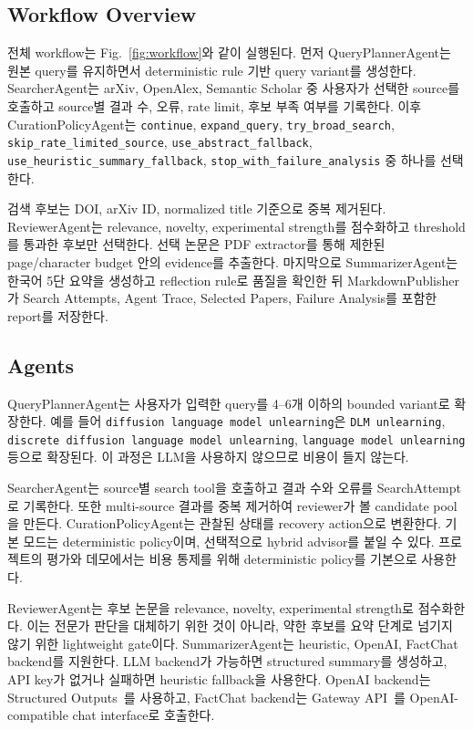 \documentclass[sigconf,nonacm]{acmart}
\begin{document}
\subsection{Workflow Overview}

전체 workflow는 Fig.~\ref{fig:workflow}와 같이 실행된다. 먼저 QueryPlannerAgent는 원본 query를 유지하면서 deterministic rule 기반 query variant를 생성한다. SearcherAgent는 arXiv, OpenAlex, Semantic Scholar 중 사용자가 선택한 source를 호출하고 source별 결과 수, 오류, rate limit, 후보 부족 여부를 기록한다. 이후 CurationPolicyAgent는 \texttt{continue}, \texttt{expand\_query}, \texttt{try\_broad\_search}, \texttt{skip\_rate\_limited\_source}, \texttt{use\_abstract\_fallback}, \texttt{use\_heuristic\_summary\_fallback}, \texttt{stop\_with\_failure\_analysis} 중 하나를 선택한다.

검색 후보는 DOI, arXiv ID, normalized title 기준으로 중복 제거된다. ReviewerAgent는 relevance, novelty, experimental strength를 점수화하고 threshold를 통과한 후보만 선택한다. 선택 논문은 PDF extractor를 통해 제한된 page/character budget 안의 evidence를 추출한다. 마지막으로 SummarizerAgent는 한국어 5단 요약을 생성하고 reflection rule로 품질을 확인한 뒤 MarkdownPublisher가 Search Attempts, Agent Trace, Selected Papers, Failure Analysis를 포함한 report를 저장한다.

\subsection{Agents}

QueryPlannerAgent는 사용자가 입력한 query를 4--6개 이하의 bounded variant로 확장한다. 예를 들어 \texttt{diffusion language model unlearning}은 \texttt{DLM unlearning}, \texttt{discrete diffusion language model unlearning}, \texttt{language model unlearning} 등으로 확장된다. 이 과정은 LLM을 사용하지 않으므로 비용이 들지 않는다.

SearcherAgent는 source별 search tool을 호출하고 결과 수와 오류를 SearchAttempt로 기록한다. 또한 multi-source 결과를 중복 제거하여 reviewer가 볼 candidate pool을 만든다. CurationPolicyAgent는 관찰된 상태를 recovery action으로 변환한다. 기본 모드는 deterministic policy이며, 선택적으로 hybrid advisor를 붙일 수 있다. 프로젝트의 평가와 데모에서는 비용 통제를 위해 deterministic policy를 기본으로 사용한다.

ReviewerAgent는 후보 논문을 relevance, novelty, experimental strength로 점수화한다. 이는 전문가 판단을 대체하기 위한 것이 아니라, 약한 후보를 요약 단계로 넘기지 않기 위한 lightweight gate이다. SummarizerAgent는 heuristic, OpenAI, FactChat backend를 지원한다. LLM backend가 가능하면 structured summary를 생성하고, API key가 없거나 실패하면 heuristic fallback을 사용한다. OpenAI backend는 Structured Outputs~\cite{openai-structured-outputs}를 사용하고, FactChat backend는 Gateway API~\cite{factchat-gateway}를 OpenAI-compatible chat interface로 호출한다.
\end{document}
